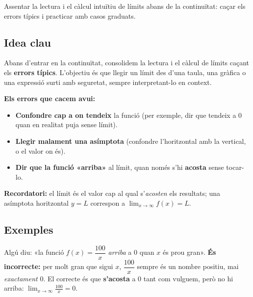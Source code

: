 %
{Assentar la lectura i el càlcul intuïtiu de límits abans de la continuïtat: caçar els errors típics i practicar amb casos graduats.}

\subsection{Idea clau}

Abans d'entrar en la continuïtat, consolidem la lectura i el càlcul de límits caçant
els \textbf{errors típics}. L'objectiu és que llegir un límit des d'una taula, una
gràfica o una expressió surti amb seguretat, sempre interpretant-lo en context.

\begin{idea}
\textbf{Els errors que cacem avui:}
\begin{itemize}[leftmargin=1.4em, itemsep=2pt]
  \item \textbf{Confondre cap a on tendeix} la funció (per exemple, dir que tendeix a
        $0$ quan en realitat puja sense límit).
  \item \textbf{Llegir malament una asímptota} (confondre l'horitzontal amb la
        vertical, o el valor on és).
  \item \textbf{Dir que la funció «arriba»} al límit, quan només s'hi
        \textbf{acosta} sense tocar-lo.
\end{itemize}
\textbf{Recordatori:} el límit és el valor cap al qual s'\emph{acosten} els resultats;
una asímptota horitzontal $y=L$ correspon a $\lim_{x\to\infty}f(x)=L$.
\end{idea}

\subsection{Exemples}

\begin{exemple}
Algú diu: «la funció $f(x)=\dfrac{100}{x}$ \emph{arriba} a $0$ quan $x$ és prou gran».
\textbf{És incorrecte:} per molt gran que sigui $x$, $\dfrac{100}{x}$ sempre és un
nombre positiu, mai \emph{exactament} $0$. El correcte és que \textbf{s'acosta} a $0$
tant com vulguem, però no hi arriba: $\lim_{x\to\infty}\frac{100}{x}=0$.
\end{exemple}

